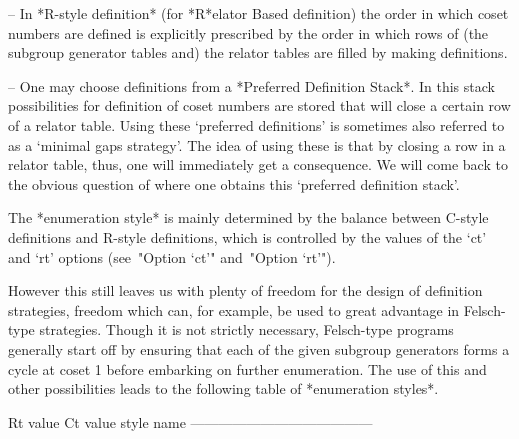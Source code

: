 \item{--} In *R-style definition* (for *R*elator Based definition) the
order in which coset numbers are defined is explicitly  prescribed  by
the order in which rows of (the subgroup  generator  tables  and)  the
relator tables are filled by making definitions.

\item{--} One may choose  definitions  from  a  *Preferred  Definition
Stack*. In this stack possibilities for definition  of  coset  numbers
are stored that will close a certain row of  a  relator  table.  Using
these \lq{}preferred definitions' is sometimes also referred to  as  a
\lq{}minimal gaps strategy'. The  idea  of  using  these  is  that  by
closing a row in a relator table, thus, one  will  immediately  get  a
consequence. We will come back to the obvious question  of  where  one
obtains this \lq{}preferred definition stack'.

\endlist

The *enumeration style* is mainly determined by  the  balance  between
C-style definitions and R-style definitions, which  is  controlled  by
the values of the `ct' and `rt' options (see~"Option `ct'" and~"Option
`rt'").

However this still leaves us with  plenty of freedom for the design of
definition  strategies,  freedom which  can, for example,  be  used to
great advantage in Felsch-type strategies. Though it is  not  strictly
necessary, Felsch-type  programs generally start off  by ensuring that
each of the given subgroup generators  forms a cycle at coset 1 before
embarking  on   further  enumeration.  The  use  of   this  and  other
possibilities leads to the following table of *enumeration styles*.


\begintt
Rt value     Ct value     style name
---------------------------------------

